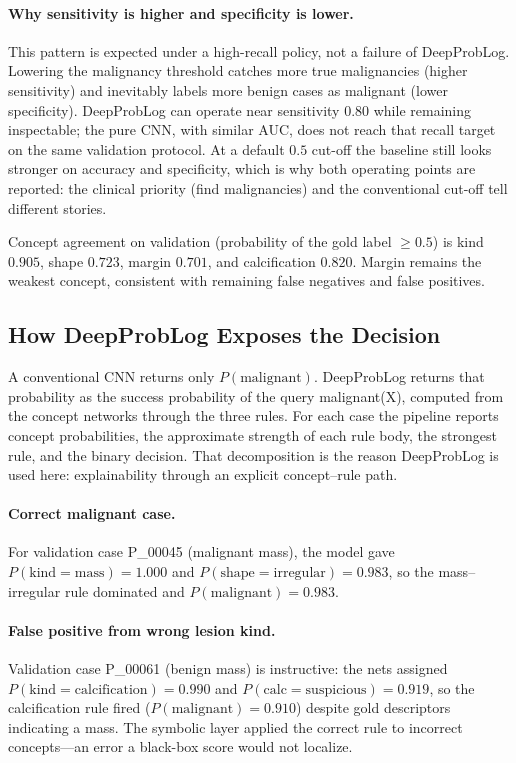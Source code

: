 \paragraph{Why sensitivity is higher and specificity is lower.}
This pattern is expected under a high-recall policy, not a failure of DeepProbLog. Lowering the malignancy threshold catches more true malignancies (higher sensitivity) and inevitably labels more benign cases as malignant (lower specificity). DeepProbLog can operate near sensitivity $0.80$ while remaining inspectable; the pure CNN, with similar AUC, does not reach that recall target on the same validation protocol. At a default $0.5$ cut-off the baseline still looks stronger on accuracy and specificity, which is why both operating points are reported: the clinical priority (find malignancies) and the conventional cut-off tell different stories.

Concept agreement on validation (probability of the gold label $\geq 0.5$) is kind $0.905$, shape $0.723$, margin $0.701$, and calcification $0.820$. Margin remains the weakest concept, consistent with remaining false negatives and false positives.

\subsection{How DeepProbLog Exposes the Decision}
\label{sec:traces}

A conventional CNN returns only $P(\mathrm{malignant})$. DeepProbLog returns that probability as the success probability of the query malignant(X), computed from the concept networks through the three rules. For each case the pipeline reports concept probabilities, the approximate strength of each rule body, the strongest rule, and the binary decision. That decomposition is the reason DeepProbLog is used here: explainability through an explicit concept--rule path.

\paragraph{Correct malignant case.}
For validation case P\_00045 (malignant mass), the model gave $P(\mathrm{kind}=\mathrm{mass})=1.000$ and $P(\mathrm{shape}=\mathrm{irregular})=0.983$, so the mass--irregular rule dominated and $P(\mathrm{malignant})=0.983$.

\paragraph{False positive from wrong lesion kind.}
Validation case P\_00061 (benign mass) is instructive: the nets assigned $P(\mathrm{kind}=\mathrm{calcification})=0.990$ and $P(\mathrm{calc}=\mathrm{suspicious})=0.919$, so the calcification rule fired ($P(\mathrm{malignant})=0.910$) despite gold descriptors indicating a mass. The symbolic layer applied the correct rule to incorrect concepts---an error a black-box score would not localize.

